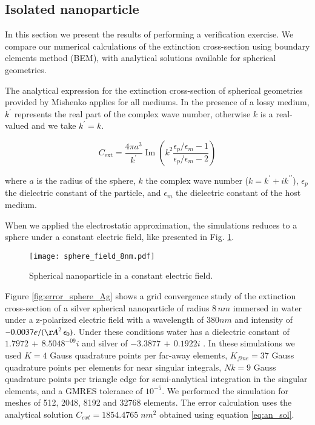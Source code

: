 
\subsection{Isolated nanoparticle} \label{sec:verification}

In this section we present the results of performing a verification exercise. We
compare our numerical calculations of the extinction cross-section using boundary
elements method (BEM), with analytical solutions available for spherical geometries. 

The analytical expression for the extinction cross-section of spherical geometries
provided by Mishenko \cite{Mishchenko2007} applies for all mediums. In the presence
of a lossy medium, $k^\prime$ represents the real part of the complex wave number,
otherwise $k$ is a real-valued and we take $k^\prime = k$. 


\begin{equation} 
    C_\text{ext} = \frac{4\pi a^3}{k^\prime} \operatorname{Im}\left(k^2 
                    \frac{\epsilon_p/\epsilon_m -1}{\epsilon_p/\epsilon_m -2}\right)
    \label{eq:an_sol}
\end{equation}

where $a$ is the radius of the sphere, $k$ the complex wave number ($k=k^\prime +i k^{\prime\prime}$), $\epsilon_p$ 
the dielectric constant of the particle, and $\epsilon_m$ the dielectric constant
of the host medium. 

When we applied the electrostatic approximation, the simulations reduces to a 
sphere under a constant electric field, like presented in Fig. \ref{fig:np_elec_field}.

\begin{figure}[h] %
   \centering
   \texttt{[image: sphere\_field\_8nm.pdf]} 
   \caption{Spherical nanoparticle in a constant electric field.}
   \label{fig:np_elec_field}
\end{figure}

Figure \ref{fig:error_sphere_Ag} shows a grid convergence study of the extinction
cross-section of a silver spherical nanoparticle of radius $8 \, nm$ immersed in water
under a z-polarized electric field with a wavelength of $380 nm$ and intensity of 
$-0.0037 e/({\AA}^2 \, \epsilon_0)$. Under these conditions water has a dielectric
constant of $1.7972 \, + \, 8.5048^{-09}i$ \cite{JohnsonChristy1972} and silver of
$-3.3877 \, + \, 0.1922i$ \cite{HaleQuerry1972}. In these simulations we used $K=4$ 
Gauss quadrature points per far-away elements, $K_{fine} = 37$ Gauss quadrature points
per elements for near singular integrals, $Nk = 9$ Gauss quadrature points per 
triangle edge for semi-analytical integration in the singular elements, and a GMRES
tolerance of $10^{-5}$. We performed the simulation for meshes of 512, 
2048, 8192 and 32768 elements. The error calculation uses the analytical solution 
$C_{ext} = 1854.4765 \; nm^2$ obtained using equation \eqref{eq:an_sol}.

